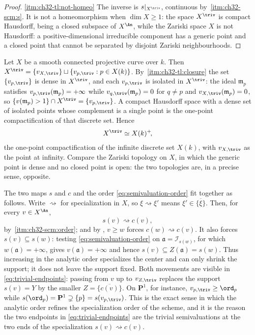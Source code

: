 \begin{proof}
\cref{itm:ch32-tl:not-homeo}  The inverse is $s|_{X^{\triv}}$, continuous by
\,\cref{itm:ch32-scm:s}.  It is not a
homeomorphism when $\dim X\geq1$: the space $X^{\triv}$ is compact
Hausdorff, being a closed subspace of $X^{\An}$, while the Zariski space
$X$ is not Hausdorff: a positive-dimensional irreducible component has a
generic point and a closed point that cannot be separated by disjoint
Zariski neighbourhoods.
\end{proof}

\begin{example}
\label{ex:ch32-trivial-locus-curve}
Let $X$ be a smooth connected projective curve over $k$.  Then
$X^{\triv}=\{v_{X,\triv}\}\sqcup\{v_{p,\triv}:p\in X(k)\}$.  By
\,\cref{itm:ch32-tl:closure} the set
$\{v_{p,\triv}\}$ is dense in $X^{\triv}$, and each $v_{p,\triv}$ is
isolated in $X^{\triv}$: the ideal $\mathfrak m_p$ satisfies
$v_{p,\triv}(\mathfrak m_p)=+\infty$ while
$v_{q,\triv}(\mathfrak m_p)=0$ for $q\neq p$ and
$v_{X,\triv}(\mathfrak m_p)=0$, so $\{v(\mathfrak m_p)>1\}\cap X^{\triv}
=\{v_{p,\triv}\}$.  A compact Hausdorff space with a dense set of isolated
points whose complement is a single point is the one-point compactification
of that discrete set.  Hence
\[
 X^{\triv}\simeq X(k)^+\!,
\]
the one-point compactification of the infinite discrete set $X(k)$,
with $v_{X,\triv}$ as the point at infinity.  Compare the Zariski topology
on $X$, in which the generic point is dense and no closed point is open:
the two topologies are, in a precise sense, opposite.
\end{example}

\begin{remark}
\label{rem:ch32-specialization}
The two maps $s$ and $c$ and the order \eqref{eq:semivaluation-order}
fit together as follows.  Write $\rightsquigarrow$ for specialization in
$X$, so $\xi\rightsquigarrow\xi'$ means
$\xi'\in\overline{\{\xi\}}$.  Then, for every $v\in X^{\An}$,
\[
 s(v)\rightsquigarrow c(v),
\]
by \,\cref{itm:ch32-scm:order}; and by
, $v\geq w$ forces
$c(w)\rightsquigarrow c(v)$.  It also forces $s(v)\subseteq s(w)$:
testing \eqref{eq:semivaluation-order} on $\mathfrak a=\mathcal I_{s(w)}$,
for which $w(\mathfrak a)=+\infty$, gives $v(\mathfrak a)=+\infty$ and
hence $s(v)\subseteq Z(\mathfrak a)=s(w)$.  Thus increasing in the
analytic order specializes the center and can only shrink the support; it
does not leave the support fixed.  Both movements are visible in
\eqref{eq:trivial-endpoints}: passing from $v$ up to
$v_{Z,\triv}$ replaces the support $s(v)=Y$ by the smaller
$Z=\overline{\{c(v)\}}$.  On $\mathbf P^1$, for instance,
$v_{p,\triv}\geq\ord_p$ while
$s(\ord_p)=\mathbf P^1\supsetneq\{p\}=s(v_{p,\triv})$.  This is the exact
sense in which the analytic order refines the specialization order of the
scheme, and it is the reason the two endpoints in
\eqref{eq:trivial-endpoints} are the trivial semivaluations at the two ends
of the specialization $s(v)\rightsquigarrow c(v)$.
\end{remark}

